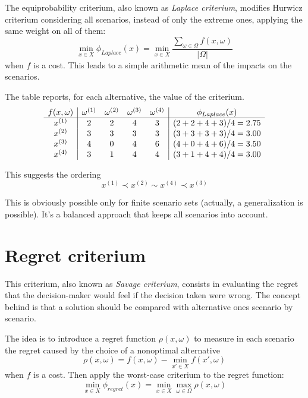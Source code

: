 The equiprobability criterium, also known as \textit{Laplace criterium}, modifies Hurwicz criterium considering all scenarios, instead of only the extreme ones, applying the same weight on all of them:
$$ \min_{x \in X} \phi_{Laplace} (x) = \min_{x \in X} \frac{\sum_{\omega \in \Omega} f(x, \omega)}{|\Omega|} $$
when $f$ is a cost. This leads to a simple arithmetic mean of the impacts on the scenarios.

The table reports, for each alternative, the value of the criterium.
$$
\begin{array}{c|cccc | c}
	f(x,\omega) & \omega^{(1)} & \omega^{(2)} & \omega^{(3)} & \omega^{(4)}  & \phi_{Laplace} (x)\\
	\hline
	x^{(1)} & 2 & 2 & 4 & 3 & (2+2+4+3)/4 = 2.75 \\
	x^{(2)} & 3 & 3 & 3 & 3 & (3+3+3+3)/4 = 3.00 \\
	x^{(3)} & 4 & 0 & 4 & 6 & (4+0+4+6)/4 = 3.50 \\
	x^{(4)} & 3 & 1 & 4 & 4 & (3+1+4+4)/4 = 3.00 \\
\end{array}
$$

This suggests the ordering
$$ x^{(1)} \prec x^{(2)} \sim x^{(4)} \prec x^{(3)} $$

This is obviously possible only for finite scenario sets (actually, a generalization is possible). It's a balanced approach that keeps all scenarios into account.

\section{Regret criterium}
\label{sec:regret}

This criterium, also known as \textit{Savage criterium}, consists in evaluating the regret that the decision-maker would feel if the decision taken were wrong. The concept behind is that a solution should be compared with alternative ones scenario by scenario.

The idea is to introduce a regret function $\rho (x, \omega)$ to measure in each scenario the regret caused by the choice of a nonoptimal alternative
$$ \rho (x, \omega) = f (x, \omega) - \min_{x' \in X} f (x', \omega) $$
when $f$ is a cost. Then apply the worst-case criterium to the regret function: 
$$ \min_{x \in X} \phi_{regret} (x) = \min_{x \in X} \max_{\omega \in \Omega} \rho (x, \omega) $$

